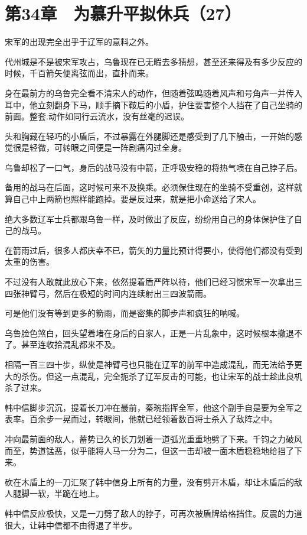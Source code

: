 \section{第34章　为慕升平拟休兵（27）}

宋军的出现完全出乎于辽军的意料之外。

代州城是不是被宋军攻占，乌鲁现在已无暇去多猜想，甚至还来得及有多少反应的时候，千百箭矢便离弦而出，直扑而来。

身在最前方的乌鲁完全看不清宋人的动作，但随着弦鸣随着风声和号角声一并传入耳中，他立刻翻身下马，顺手摘下鞍后的小盾，护住要害整个人挡在了自己坐骑的前面。整套.动作如同行云流水，没有丝毫的迟误。

头和胸藏在轻巧的小盾后，不过暴露在外腿脚还是感受到了几下触击，一开始的感觉很是轻微，可转眼之间便是一阵剧痛闪过全身。

乌鲁却松了一口气，身后的战马没有中箭，正呼吸安稳的将热气喷在自己脖子后。

备用的战马在后面，这时候可来不及换乘。必须保住现在的坐骑不受重创，这样就算自己中上两箭也照样能跑掉。要是反过来，就是把小命送给了宋人。

绝大多数辽军士兵都跟乌鲁一样，及时做出了反应，纷纷用自己的身体保护住了自己的战马。

在箭雨过后，很多人都庆幸不已，箭矢的力量比预计得要小，使得他们都没有受到太重的伤害。

不过没有人敢就此放心下来，依然提着盾严阵以待，他们已经习惯宋军一次拿出三四张神臂弓，然后在极短的时间内连续射出三四波箭雨。

可是他们没有等到更多的箭雨，而是密集的脚步声和疯狂的呐喊。

乌鲁脸色煞白，回头望着堵在身后的自家人，正是一片乱象中，这时候根本撤退不了。甚至连收拾混乱都来不及。

相隔一百三四十步，纵使是神臂弓也只能在辽军的前军中造成混乱，而无法给予更大的杀伤。但这一点混乱，完全扼杀了辽军反击的可能，也让宋军的战士趁此良机杀了过来。

韩中信脚步沉沉，提着长刀冲在最前，秦琬指挥全军，他这个副手自是要为全军之表率。百余步一晃而过，转眼间，他就已经领着数百将士杀入了敌阵之中。

冲向最前面的敌人，蓄势已久的长刀划着一道弧光重重地劈了下来。千钧之力破风而至，势道锰恶，似乎能将人马一分为二，但这一击却被一面木盾稳稳地给挡了下来。

砍在木盾上的一刀汇聚了韩中信身上所有的力量，没有劈开木盾，却让木盾后的敌人腿脚一软，半跪在地上。

韩中信反应极快，又是一刀劈了敌人的脖子，可再次被盾牌给格挡住。反震的力道很大，让韩中信都不由得退了半步。

